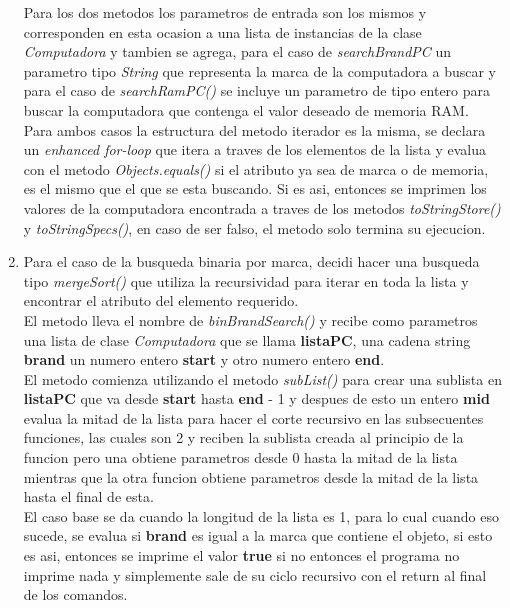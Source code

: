 \documentclass{article}
\begin{document}
\begin{enumerate}
				Para los dos metodos los parametros de entrada son los mismos y corresponden en esta ocasion a una lista de instancias de la clase \emph{Computadora} y tambien se agrega, para el caso de \emph{searchBrandPC} un parametro tipo \textit{String} que representa la marca de la computadora a buscar y para el caso de \emph{searchRamPC()} se incluye un parametro de tipo entero para buscar la computadora que contenga el valor deseado de memoria RAM.\\
				
				Para ambos casos la estructura del metodo iterador es la misma, se declara un \emph{enhanced for-loop} que itera a traves de los elementos de la lista y evalua con el metodo \emph{Objects.equals()} si el atributo ya sea de marca o de memoria, es el mismo que el que se esta buscando. Si es asi, entonces se imprimen los valores de la computadora encontrada a traves de los metodos \emph{toStringStore()} y \emph{toStringSpecs()}, en caso de ser falso, el metodo solo termina su ejecucion.\\ 
				
				\item Para el caso de la busqueda binaria por marca, decidi hacer una busqueda tipo \emph{mergeSort()} que utiliza la recursividad para iterar en toda la lista y encontrar el atributo del elemento requerido.\\
				
				El metodo lleva el nombre de \emph{binBrandSearch()} y recibe como parametros una lista de clase \emph{Computadora} que se llama \textbf{listaPC}, una cadena string \textbf{brand} un numero entero \textbf{start} y otro numero entero \textbf{end}.\\
				
				El metodo comienza utilizando el metodo \emph{subList()} para crear una sublista en \textbf{listaPC} que va desde \textbf{start} hasta \textbf{end} - 1 y despues de esto un entero \textbf{mid} evalua la mitad de la lista para hacer el corte recursivo en las subsecuentes funciones, las cuales son 2 y reciben la sublista creada al principio de la funcion pero una obtiene parametros desde 0 hasta la mitad de la lista mientras que la otra funcion obtiene parametros desde la mitad de la lista hasta el final de esta.\\
				
				El caso base se da cuando la longitud de la lista es 1, para lo cual cuando eso sucede, se evalua si \textbf{brand} es igual a la marca que contiene el objeto, si esto es asi, entonces se imprime el valor \textbf{true} si no entonces el programa no imprime nada y simplemente sale de su ciclo recursivo con el return al final de los comandos. \\
				
			\end{enumerate}
			
\end{document}
